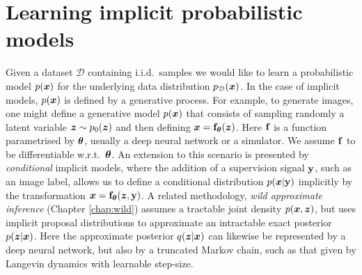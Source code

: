 \section{Learning implicit probabilistic models}

Given a dataset $\mathcal{D}$ containing i.i.d.~samples we would like to learn a probabilistic model $p(\bm{x})$ for the underlying data distribution $p_{\mathcal{D}}(\bm{x})$. In the case of implicit models, $p(\bm{x})$ is defined by a generative process. For example, to generate images, one might define a generative model $p(\bm{x})$ that consists of sampling randomly a latent variable $\bm{z} \sim p_0(\bm{z})$ and then defining $\bm{x} = \mathbf{f}_{\bm{\theta}}(\bm{z})$. Here $\mathbf{f}$ is a function parametrised by $\bm{\theta}$, usually a deep neural network or a simulator. We assume $\mathbf{f}$ to be differentiable w.r.t.~$\bm{\theta}$. An extension to this scenario is presented by \emph{conditional} implicit models, where the addition of a supervision signal $\mathbf{y}$, such as an image label, allows us to define a conditional distribution $p(\bm{x}| \mathbf{y})$ implicitly by the transformation $\bm{x} = \mathbf{f}_{\bm{\theta}}(\bm{z}, \mathbf{y})$. A related methodology, \emph{wild approximate inference} (Chapter \ref{chap:wild}) assumes a tractable joint density $p(\bm{x}, \bm{z})$, but uses implicit proposal distributions to approximate an intractable exact posterior $p(\bm{z}|\bm{x})$. Here the approximate posterior $q(\bm{z}|\bm{x})$ can likewise be represented by a deep neural network, but also by a truncated Markov chain, such as that given by Langevin dynamics with learnable step-size. 


